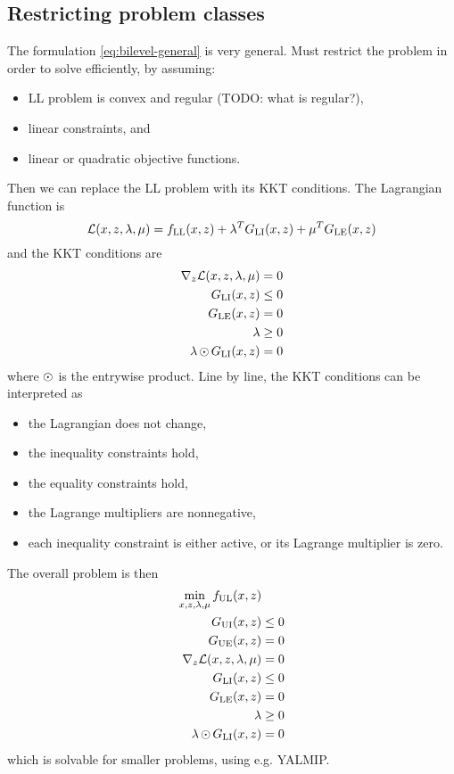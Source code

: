 \subsection{Restricting problem classes}
The formulation \eqref{eq:bilevel-general} is very general. Must restrict the problem in order to solve efficiently, by assuming:
%
\begin{itemize}
  \item LL problem is convex and regular (TODO: what is regular?),
  \item linear constraints, and
  \item linear or quadratic objective functions.
\end{itemize}
%
Then we can replace the LL problem with its KKT conditions. The Lagrangian function is
%
\begin{equation}
  \mathcal{L}(x,z,\lambda,\mu) = f_\mathrm{LL}(x,z) + \lambda^T G_\mathrm{LI}(x,z) + \mu^T G_\mathrm{LE}(x,z)
\end{equation}
%
and the KKT conditions are
%
\begin{equation}
  \begin{split}
    \nabla_z \mathcal{L}(x,z,\lambda,\mu) &= 0 \\
    G_\mathrm{LI}(x,z) &\leq 0 \\
    G_\mathrm{LE}(x,z) &= 0 \\
    \lambda &\geq 0 \\
    \lambda \operatorname{\odot} G_\mathrm{LI}(x,z) &= 0
  \end{split}
\end{equation}
%
where $\operatorname{\odot}$ is the entrywise product. Line by line, the KKT conditions can be interpreted as
%
\begin{itemize}
  \item the Lagrangian does not change,
  \item the inequality constraints hold,
  \item the equality constraints hold,
  \item the Lagrange multipliers are nonnegative,
  \item each inequality constraint is either active, or its Lagrange multiplier is zero.
\end{itemize}
%
The overall problem is then
%
\begin{equation}\label{eq:bilevel-kkt}
  \begin{split}
    \min_{x,z,\lambda,\mu} f_\mathrm{UL}(x,z) & \\
    G_\mathrm{UI}(x,z) & \leq 0 \\
    G_\mathrm{UE}(x,z) &= 0 \\
    \nabla_z \mathcal{L}(x,z,\lambda,\mu) &= 0 \\
    G_\mathrm{LI}(x,z) &\leq 0 \\
    G_\mathrm{LE}(x,z) &= 0 \\
    \lambda &\geq 0 \\
    \lambda \operatorname{\odot} G_\mathrm{LI}(x,z) &= 0 \\
  \end{split}
\end{equation}
%
which is solvable for smaller problems, using e.g. YALMIP.

